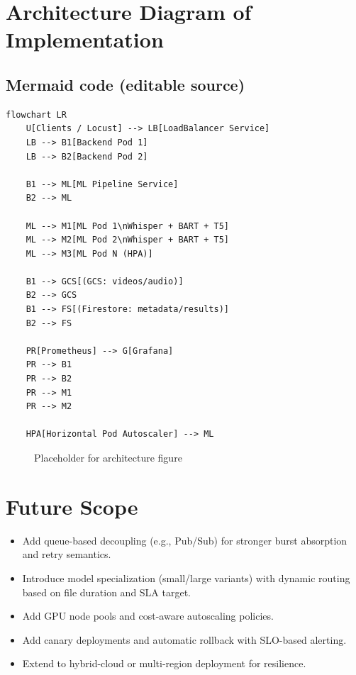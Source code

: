 \documentclass[11pt,a4paper]{article}
\begin{document}
\section{Architecture Diagram of Implementation}
\subsection*{Mermaid code (editable source)}
\begin{lstlisting}
flowchart LR
    U[Clients / Locust] --> LB[LoadBalancer Service]
    LB --> B1[Backend Pod 1]
    LB --> B2[Backend Pod 2]

    B1 --> ML[ML Pipeline Service]
    B2 --> ML

    ML --> M1[ML Pod 1\nWhisper + BART + T5]
    ML --> M2[ML Pod 2\nWhisper + BART + T5]
    ML --> M3[ML Pod N (HPA)]

    B1 --> GCS[(GCS: videos/audio)]
    B2 --> GCS
    B1 --> FS[(Firestore: metadata/results)]
    B2 --> FS

    PR[Prometheus] --> G[Grafana]
    PR --> B1
    PR --> B2
    PR --> M1
    PR --> M2

    HPA[Horizontal Pod Autoscaler] --> ML
\end{lstlisting}

\begin{figure}[H]
\centering
{}
\caption{Placeholder for architecture figure}
\end{figure}

\section{Future Scope}
\begin{itemize}
    \item Add queue-based decoupling (e.g., Pub/Sub) for stronger burst absorption and retry semantics.
    \item Introduce model specialization (small/large variants) with dynamic routing based on file duration and SLA target.
    \item Add GPU node pools and cost-aware autoscaling policies.
    \item Add canary deployments and automatic rollback with SLO-based alerting.
    \item Extend to hybrid-cloud or multi-region deployment for resilience.
\end{itemize}
\end{document}
